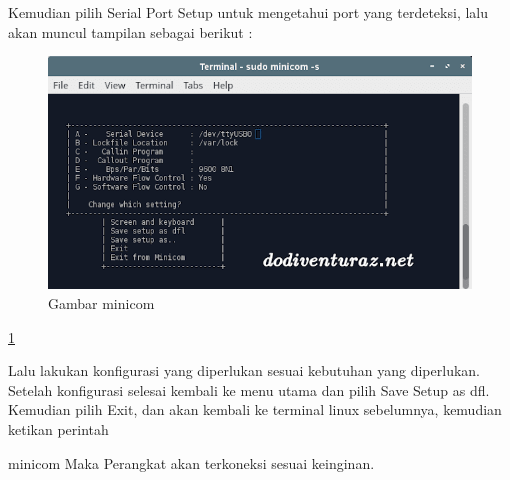 	Kemudian pilih Serial Port Setup untuk mengetahui port yang terdeteksi, lalu akan muncul tampilan sebagai berikut :
	
	\begin{figure} [ht]
	\centerline{\includegraphics[width=1\textwidth]{figures/minicom.png}}
	\caption{Gambar minicom}
	\label{minicom}
	\end{figure}
	
	\ref{minicom}
	
	Lalu lakukan konfigurasi yang diperlukan sesuai kebutuhan yang diperlukan. Setelah konfigurasi selesai kembali ke menu utama dan pilih Save Setup as dfl. Kemudian pilih Exit, dan akan kembali ke terminal linux sebelumnya, kemudian ketikan perintah 
	
	minicom
	Maka Perangkat akan terkoneksi sesuai keinginan.

	


